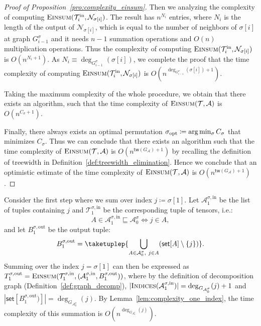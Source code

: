 \documentclass[twoside,11pt]{article}
\newcommand{\takesetp}[1]{\mathsf{set}[#1]}
\newcommand{\indexset}{\textsc{Indices}}
\newcommand{\tensorcontraction}{\textsc{Einsum}}
\newcommand{\degp}[2]{\deg_{#2}(#1)}
\newcommand{\treewidthp}[1]{\mathsf{tw}(#1)}
\newcommand{\graphform}[1]{G_{#1}}
\newcommand{\less}{O}
\def\calN{\mathcal{N}}
\def\calA{\mathcal{A}}
\def\calT{\mathcal{T}}
\begin{document}
\begin{proof}[Proof of Proposition~\ref{pro:complexity_einsum}]
Then we analyzing the complexity of computing $\tensorcontraction(\calT_i^{\mathrm{in}},\calN_{\sigma[i]})$. The result has $n^{N_i}$ entries, where $N_i$ is the length of the output of $\calN_{\sigma[i]}$, which is equal to the number of neighbors of $\sigma[i]$ at graph $G^\sigma_{i-1}$ and it needs $n-1$ summation operations and $\less(n)$ multiplication operations. Thus the complexity of computing $\tensorcontraction(\calT_i^{\mathrm{in}},\calN_{\sigma[i]})$ is $O(n^{N_i+1})$. As $N_i \equiv \degp{\sigma[i]}{G^\sigma_{i-1}}$, we complete the proof that the time complexity of computing $\tensorcontraction(\calT_i^{\mathrm{in}},\calN_{\sigma[i]})$ is $\less(n^{\degp{\sigma[i]}{G^\sigma_{i-1}}+1})$.

Taking the maximum complexity of the whole procedure, we obtain that there exists an algorithm, such that the time complexity of $\tensorcontraction(\calT, \calA)$ is $\less(n^{C_\sigma + 1})$.

Finally, there always exists an optimal permutation $\sigma_{\rm opt} \coloneqq \arg \min_{\sigma} C_{\sigma}$ that minimizes $C_\sigma$. Thus we can conclude that there exists an algorithm such that the time complexity of $\tensorcontraction(\calT, \calA)$ is $\less(n^{\treewidthp{G_\calA}+1})$ by recalling the definition of treewidth in Definition~\ref{def:treewidth_elimination}. Hence we conclude that an optimistic estimate of the time complexity of $\tensorcontraction(\calT, \calA)$ is $\less(n^{\treewidthp{G_\calA}+1})$.
\end{proof}
\fi
\iffalse
Consider the first step where we sum over index $j \coloneqq \sigma[1]$. Let $\calA^{\sigma, \mathrm{in}}_{1}$ be the list of tuples containing $j$ and $\calT^{\sigma, \mathrm{in}}_{1}$ be the corresponding tuple of tensors, i.e.:
    \begin{equation*}
    A \in \calA^{\sigma, \mathrm{in}}_{1} \sqsubseteq \calA^{\sigma}_0 \iff j \in A,
    \end{equation*}
    and let $B^{\sigma, \mathrm{out}}_{1}$ be the output tuple: 
    \begin{equation*}
    B^{\sigma, \mathrm{out}}_{1} = \taketuplep{\bigcup_{A \in \calA^{\sigma}_{0},\ j \in A} (\takesetp{A} \setminus \{j\}) }. 
    \end{equation*}
    Summing over the index $j = \sigma[1]$ can then be expressed as $T^{\sigma,\mathrm{out}}_{1} = \tensorcontraction(\calT^{\sigma, \mathrm{in}}_{1}, (\calA^{\sigma, \mathrm{in}}_{1}, B^{\sigma, \mathrm{out}}_{1}))$, where by the definition of decomposition graph (Definition~\ref{def:graph_decomp}), $|\indexset(\calA^{\sigma, \mathrm{in}}_{1})| = \degp{j}{\graphform{\calA^{\sigma}_0}} + 1$ and $|\takesetp{B^{\sigma, \mathrm{out}}_{1})}| = \degp{j}{\graphform{\calA^{\sigma}_0}}$. By Lemma~\ref{lem:complexity_one_index}, the time complexity of this summation is $\less(n^{\degp{j}{\graphform{\calA^{\sigma}_0}}} )$. 
    
\end{document}
